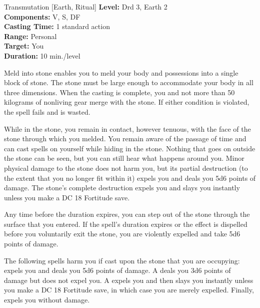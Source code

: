 {Transmutation [Earth, Ritual]}
{
	\textbf{Level:}
	Drd 3, Earth 2\\
	\textbf{Components:}
	V, S, DF\\
	\textbf{Casting Time:}
	1 standard action\\
	\textbf{Range:}
	Personal\\
	\textbf{Target:}
	You\\
	\textbf{Duration:}
	10 min./level\\
}
{
	Meld into stone enables you to meld your body and possessions into a single block of stone. The stone must be large enough to accommodate your body in all three dimensions. When the casting is complete, you and not more than 50 kilograms of nonliving gear merge with the stone. If either condition is violated, the spell fails and is wasted.

	While in the stone, you remain in contact, however tenuous, with the face of the stone through which you melded. You remain aware of the passage of time and can cast spells on yourself while hiding in the stone. Nothing that goes on outside the stone can be seen, but you can still hear what happens around you. Minor physical damage to the stone does not harm you, but its partial destruction (to the extent that you no longer fit within it) expels you and deals you 5d6 points of damage. The stone's complete destruction expels you and slays you instantly unless you make a DC 18 Fortitude save.

	Any time before the duration expires, you can step out of the stone through the surface that you entered. If the spell's duration expires or the effect is dispelled before you voluntarily exit the stone, you are violently expelled and take 5d6 points of damage.

	The following spells harm you if cast upon the stone that you are occupying:  expels you and deals you 5d6 points of damage. A  deals you 3d6 points of damage but does not expel you. A  expels you and then slays you instantly unless you make a DC 18 Fortitude save, in which case you are merely expelled. Finally,  expels you without damage.

}
